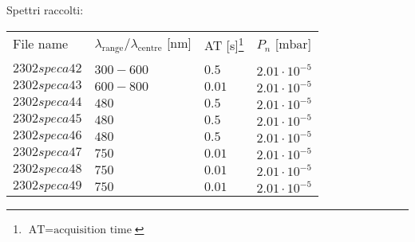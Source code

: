 Spettri raccolti:
\begin{center}
\begin{tabular}{p{3cm}p{4cm}p{2cm}p{3cm}}
\toprule
File name	&$\lambda_\text{range}\text{/}\lambda_\text{centre}$ [nm] &AT [s]\footnote{$\text{AT}=\text{acquisition time}$} &$P_{n}$ [$\si{\milli\bar}$]\\					&\\
\midrule
$2302speca42$	&$300-600$	&$0.5$		&$2.01\cdot10^{-5}$\\
$2302speca43$	&$600-800$	&$0.01$		&$2.01\cdot10^{-5}$\\
$2302speca44$	&$480$		&$0.5$		&$2.01\cdot10^{-5}$\\
$2302speca45$	&$480$		&$0.5$		&$2.01\cdot10^{-5}$\\
$2302speca46$	&$480$		&$0.5$		&$2.01\cdot10^{-5}$\\
$2302speca47$	&$750$		&$0.01$		&$2.01\cdot10^{-5}$\\
$2302speca48$	&$750$		&$0.01$		&$2.01\cdot10^{-5}$\\
$2302speca49$	&$750$		&$0.01$		&$2.01\cdot10^{-5}$\\
\bottomrule
\end{tabular}
\end{center}



